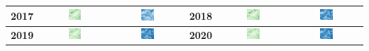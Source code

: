 \begin{longtable}{|c|c|c|c|c|c|}
    \textbf{2017} & \includegraphics[width=0.2\textwidth]{img_sat/NDVI_2017.png} & \includegraphics[width=0.2\textwidth]{img_sat/NSI_2017.png} &
    \textbf{2018} & \includegraphics[width=0.2\textwidth]{img_sat/NDVI_2018.png} & \includegraphics[width=0.2\textwidth]{img_sat/NSI_2018.png} \\
    \hline
    

    \textbf{2019} & \includegraphics[width=0.2\textwidth]{img_sat/NDVI_2019.png} & \includegraphics[width=0.2\textwidth]{img_sat/NSI_2019.png} &
    \textbf{2020} & \includegraphics[width=0.2\textwidth]{img_sat/NDVI_2020.png} & \includegraphics[width=0.2\textwidth]{img_sat/NSI_2020.png} \\
    \hline
    


\end{longtable}

